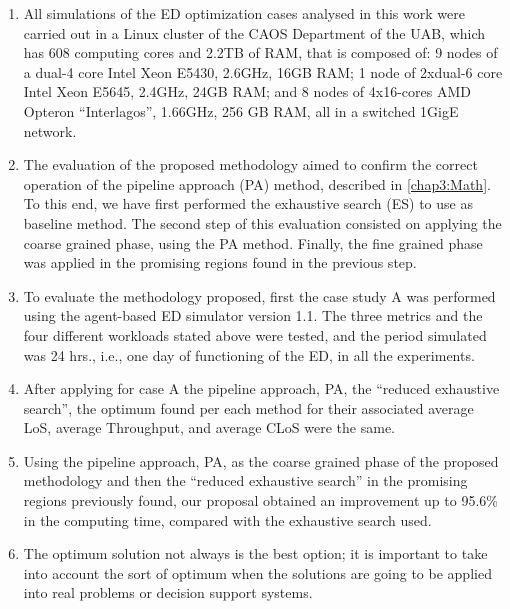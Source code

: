 \documentclass[11pt]{article} %
\begin{document}
\begin{enumerate}
\item All simulations of the ED optimization cases analysed in this work
were carried out in a Linux cluster of the CAOS Department of the
UAB, which has 608 computing cores and 2.2TB of RAM, that is composed
of: 9 nodes of a dual-4 core Intel Xeon E5430, 2.6GHz, 16GB RAM; 1
node of 2xdual-6 core Intel Xeon E5645, 2.4GHz, 24GB RAM; and 8 nodes
of 4x16-cores AMD Opteron ``Interlagos'', 1.66GHz, 256 GB RAM, all
in a switched 1GigE network.\\

\item The evaluation of the proposed methodology aimed to confirm the correct
operation of  the pipeline approach (PA)
method, described in \ref{chap3:Math}. To this end, we have first
performed the exhaustive search (ES) to use as baseline method. The
second step of this evaluation consisted on applying the coarse grained
phase, using the PA method.
Finally, the fine grained phase was applied in the promising regions
found in the previous step.\\

\item To evaluate the methodology proposed, first the case study A was performed
using the agent-based ED simulator version 1.1. The three metrics and the four different workloads stated
above were tested, and the period simulated was 24 hrs., i.e., one
day of functioning of the ED, in all the experiments.\\

\item After  applying for case A  the pipeline approach,
PA, the \textquotedblleft{}reduced
exhaustive search\textquotedblright{}, the optimum found per each
method for their associated average LoS, average Throughput, and average
CLoS were the same.\\

\item Using the pipeline approach, PA, as the coarse grained phase of the
proposed methodology and then the \textquotedblleft{}reduced exhaustive
search\textquotedblright{} in the promising regions previously found,
our proposal obtained an improvement up to 95.6\% in the computing
time, compared with the
exhaustive search used.
\item The optimum solution not always is the best option; it is important
to take into account the sort of optimum when the solutions are going
to be applied into real problems or decision support systems.
\end{enumerate}
\end{document}
